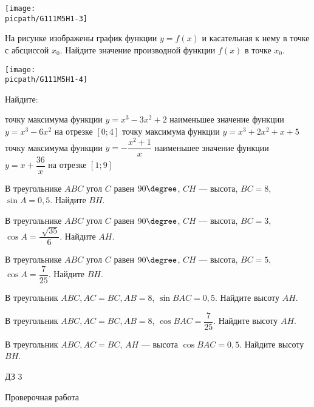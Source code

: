 \begin{homework}[number=1]
\begin{listofex}
\begin{minipage}[t]{\picwidth}
			\texttt{[image: \\picpath/G111M5H1-3]}
		\end{minipage}
		\item
		\begin{minipage}[t]{\bodywidth}
			На рисунке изображены график функции \(y = f(x)\) и касательная к нему в точке с абсциссой \(x_0\). Найдите значение производной функции \(f(x)\) в точке \(x_0\).
		\end{minipage}
		\hspace{0.02\linewidth}
		\begin{minipage}[t]{\picwidth}
			\texttt{[image: \\picpath/G111M5H1-4]}
		\end{minipage}
		\item Найдите:
		\begin{itasks}[1]
			\task точку максимума функции \(y = x^3 - 3x^2 + 2\)
			\task наименьшее значение функции \(y = x^3 - 6x^2\) на отрезке \([0;4]\)
			\task точку максимума функции \(y = x^3 + 2x^2 + x + 5\)
			\task точку максимума функции \(y = -\dfrac{x^2+1}{x}\)
			\task наименьшее значение функции \(y = x + \dfrac{36}{x}\) на отрезке \([1;9]\)
		\end{itasks}
	\end{listofex}
\end{homework}

\begin{homework}[number=2]
	\begin{listofex}
		\item В треугольнике \(ABC\) угол \(C\) равен \(90 \degree \), \(CH\) --- высота, \(BC = 8\), \(\sin{A} = 0,5\). Найдите \(BH\).
		\item В треугольнике \(ABC\) угол \(C\) равен \(90 \degree \), \(CH\) --- высота, \(BC=3\), \(\cos{A} = \dfrac{\sqrt[]{35}}{6}\). Найдите \(AH\).
		\item В треугольнике \(ABC\) угол \(C\) равен \(90 \degree \), \(CH\) --- высота, \(BC=5\), \(\cos{A} = \dfrac{7}{25}\). Найдите \(BH\).
		\item В треугольник \(ABC, AC = BC, AB = 8\), \( \sin{BAC}= 0,5 \). Найдите высоту \(AH\).
		\item В треугольник \(ABC, AC = BC, AB = 8\), \( \cos{BAC}= \dfrac{7}{25} \). Найдите высоту \(AH\).
		\item В треугольник \(ABC, AC = BC\), \(AH\) --- высота \( \cos{BAC}= 0,5 \). Найдите высоту \(BH\).
	\end{listofex}
\end{homework}

\begin{homework}[number=3]
	\begin{listofex}
		\item ДЗ 3
	\end{listofex}
\end{homework}

\begin{exam}
	\begin{listofex}
		\item Проверочная работа
	\end{listofex}
\end{exam}
